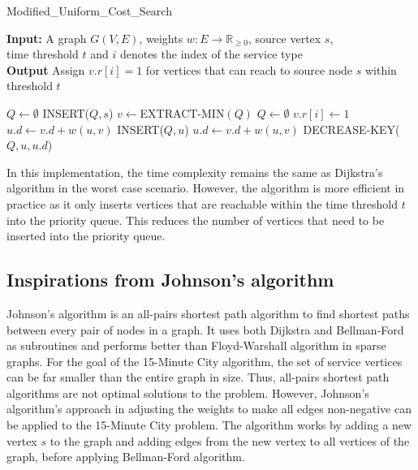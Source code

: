 \begin{algorithm}[H]
    \caption{Modified_Uniform_Cost_Search} \label{alg:uniform_cost_search}
    \textbf{Input:} A graph $G(V,E)$, weights $w:E\rightarrow\mathbb{R}_{\geq 0}$, source vertex $s$, \\  time threshold $t$ and $i$ denotes the index of the service type\\
    \textbf{Output} Assign $v.r[i]=1$ for vertices that can reach to source node $s$ within threshold $t$ %
    \begin{algorithmic}
        \State $Q\gets\emptyset$ 
        \State INSERT($Q,s$)
            \State $v\gets$EXTRACT-MIN$(Q)$
                \State $Q\gets\emptyset$ 
            \Else
                \State $v.r[i] \gets 1 $
                        \State $u.d\gets v.d+w(u,v)$ %
                        \State INSERT($Q,u$)
                        \State $u.d\gets v.d+w(u,v)$
                        \State DECREASE-KEY($Q,u,u.d$)
                    \EndIf
                \EndFor
            \EndIf
        \EndWhile
    \end{algorithmic}
\end{algorithm}

In this implementation, the time complexity remains the same as Dijkstra's algorithm in the worst case scenario. However, the algorithm is more efficient in practice as it only inserts vertices that are reachable within the time threshold $t$ into the priority queue. This reduces the number of vertices that need to be inserted into the priority queue.

\subsection{Inspirations from Johnson's algorithm}

Johnson's algorithm is an all-pairs shortest path algorithm to find shortest paths between every pair of nodes in a graph. It uses both Dijkstra and Bellman-Ford as subroutines and performs better than Floyd-Warshall algorithm in sparse graphs. For the goal of the 15-Minute City algorithm, the set of service vertices can be far smaller than the entire graph in size. Thus, all-pairs shortest path algorithms are not optimal solutions to the problem. However, Johnson's algorithm's approach in adjusting the weights to make all edges non-negative can be applied to the 15-Minute City problem. The algorithm works by adding a new vertex $s$ to the graph and adding edges from the new vertex to all vertices of the graph, before applying Bellman-Ford algorithm.

